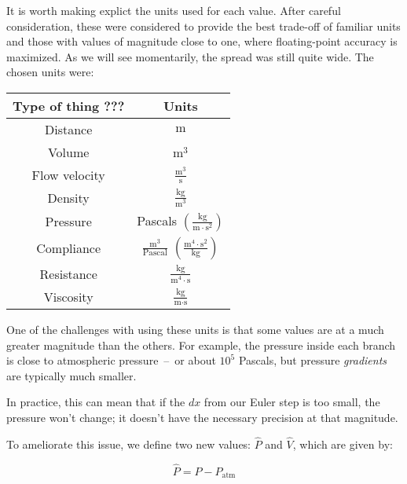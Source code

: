 It is worth making explict the units used for each value. After careful consideration, these were
considered to provide the best trade-off of familiar units and those with values of magnitude close
to one, where floating-point accuracy is maximized. As we will see momentarily, the spread was still
quite wide. The chosen units were:

{
    \renewcommand{\arraystretch}{1.6}
    \begin{table}[h]
    \centering
    \begin{tabular}{ |c|c| }
        \hline
        Type of thing ??? & Units \\
        \hline \hline
        Distance & $\text{m}$ \\
        \hline
        Volume & $\text{m}^3$ \\
        \hline
        Flow velocity & $\frac{ \text{m}^3 }{ \text{s} }$ \\
        \hline
        Density & $\frac{ \text{kg} }{ \text{m}^3 }$ \\
        \hline
        Pressure & Pascals $\left( \frac{ \text{kg} }{ \text{m} \cdot \text{s}^2 } \right)$ \\
        \hline
        Compliance & $\frac{ \text{m}^3 }{ \text{Pascal} }$ $\left( \frac{ \text{m}^4 \cdot \text{s}^2 }{ \text{kg} } \right)$ \\
        \hline
        Resistance & $\frac{ \text{kg} }{ \text{m}^4 \cdot \text{s} }$ \\
        \hline
        Viscosity & $\frac{ \text{kg} }{ \text{m} \cdot \text{s} }$ \\
        \hline
    \end{tabular}
    \end{table}
}

One of the challenges with using these units is that some values are at a much greater magnitude
than the others. For example, the pressure inside each branch is close to atmospheric pressure~--~or
about $10^5$ Pascals, but pressure \textit{gradients} are typically much smaller.

In practice, this can mean that if the $dx$ from our Euler step is too small, the pressure won't
change; it doesn't have the necessary precision at that magnitude.

\breakpars

To ameliorate this issue, we define two new values: $\hat{P}$ and $\hat{V}$, which are given by:

\begin{equation}
    \hat{P} = P - P_{\text{atm}}
\end{equation}

